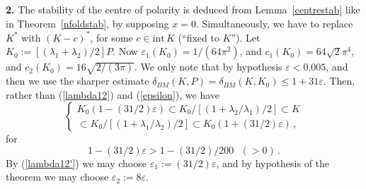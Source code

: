 \documentclass[12pt]{article}
\begin{document}
{\bf{2.}}
The stability of the centre of polarity is deduced from 
Lemma~\ref{centrestab}
like in Theorem~\ref{nfoldstab}, by supposing $x=0$.
Simultaneously,
we have to replace $K^*$ with $(K-c)^*$, for some $c \in {\text{int}}\,K$
(``fixed to $K$''). Let $K_0:=[(\lambda _1 + \lambda _2)/2]P$.
Now 
$\varepsilon _1 (K_0)=1/(64 \pi ^2)$,
and $c_1(K_0)=64 {\sqrt{2}}\pi ^4$, and
$c_2(K_0)=16\sqrt{2/(3 \pi )}$.
We only note that 
by hypothesis $\varepsilon < 0.005$, 
and then
we use the sharper estimate
$\delta _{BM}(K,P) = \delta _{BM}(K,K_0) \le 1 + 31 \varepsilon $.
Then, rather than (\ref{lambda12}) and (\ref{epsilon}), we have 
\begin{equation}
\label{lambda12'}
\begin{cases}
K_0 \left( 1-(31/2) \varepsilon \right) 
\subset K_0/[(1+\lambda _2 / \lambda _1)/2]
\subset K \\
\subset K_0/[(1+\lambda _1 / \lambda _2 )/2] \subset K_0 \left( 1+(31/2)
\varepsilon \right) \,,
\end{cases}
\end{equation}
for
\begin{equation}
\label{epsilon'}
1-(31/2) \varepsilon > 1-(31/2)/200 \,\,\,\,(>0)\,.
\end{equation}
By (\ref{lambda12'}) we may choose $\varepsilon _1:=(31/2) \varepsilon $, and
by hypothesis of the theorem we may choose $\varepsilon _2 :=8 \varepsilon $.
\end{document}

